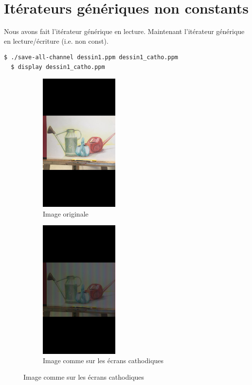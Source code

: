 \documentclass[a4paper,10pt]{article}
\begin{document}
    \section{Itérateurs génériques non constants}
    Nous avons fait l'itérateur générique en lecture. Maintenant l'itérateur générique en lecture/écriture (i.e. non const).
     \begin{lstlisting}[language=Bash]
  $ ./save-all-channel dessin1.ppm dessin1_catho.ppm
  $ display dessin1_catho.ppm
  \end{lstlisting}
   \begin{figure}[h]
   \begin{subfigure}{0.6\textwidth}
    \includegraphics[width=1\linewidth, height=7cm]{dessin1}
    \caption{Image originale}
    \label{fig:dessin1Origin}
    \end{subfigure}
     \begin{subfigure}{0.6\textwidth}
    \includegraphics[width=1\linewidth, height=7cm]{dessin1_catho}   
    \caption{Image comme sur les écrans cathodiques}
    \label{fig:dessin1Catho}
    \end{subfigure}
    \end{figure}
    \pagebreak
\end{document}
